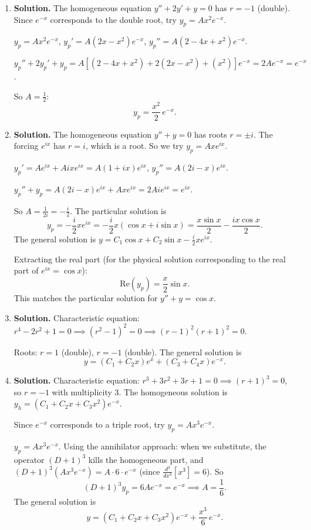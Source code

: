 \begin{enumerate}
Roots: $r=1$ (double), $r=2$. The general solution is
\[
\boxed{y = (C_1+C_2 x)e^x + C_3 e^{2x}}.
\]

\item \textbf{Solution.}
The homogeneous equation $y''+2y'+y=0$ has $r=-1$ (double). Since $e^{-x}$ corresponds to the double root, try $y_p=Ax^2 e^{-x}$.

$y_p=Ax^2 e^{-x}$, $y_p'=A(2x-x^2)e^{-x}$, $y_p''=A(2-4x+x^2)e^{-x}$.

$y_p''+2y_p'+y_p = A[(2-4x+x^2)+2(2x-x^2)+(x^2)]e^{-x}=2Ae^{-x}=e^{-x}$.

So $A=\frac{1}{2}$:
\[
\boxed{y_p = \frac{x^2}{2}\,e^{-x}}.
\]

\item \textbf{Solution.}
The homogeneous equation $y''+y=0$ has roots $r=\pm i$. The forcing $e^{ix}$ has $r=i$, which is a root. So we try $y_p=Axe^{ix}$.

$y_p'=Ae^{ix}+Aixe^{ix}=A(1+ix)e^{ix}$, $y_p''=A(2i-x)e^{ix}$.

$y_p''+y_p = A(2i-x)e^{ix}+Axe^{ix}=2Aie^{ix}=e^{ix}$.

So $A=\frac{1}{2i}=-\frac{i}{2}$. The particular solution is
\[
y_p = -\frac{i}{2}xe^{ix} = -\frac{i}{2}x(\cos x+i\sin x) = \frac{x\sin x}{2}-\frac{ix\cos x}{2}.
\]
The general solution is $y = C_1\cos x + C_2\sin x - \frac{i}{2}xe^{ix}$.

Extracting the real part (for the physical solution corresponding to the real part of $e^{ix}=\cos x$):
\[
\boxed{\text{Re}(y_p) = \frac{x}{2}\sin x}.
\]
This matches the particular solution for $y''+y=\cos x$.

\item \textbf{Solution.}
Characteristic equation: $r^4-2r^2+1=0 \implies (r^2-1)^2=0 \implies (r-1)^2(r+1)^2=0$.

Roots: $r=1$ (double), $r=-1$ (double). The general solution is
\[
\boxed{y = (C_1+C_2 x)e^x+(C_3+C_4 x)e^{-x}}.
\]

\item \textbf{Solution.}
Characteristic equation: $r^3+3r^2+3r+1=0 \implies (r+1)^3=0$, so $r=-1$ with multiplicity 3. The homogeneous solution is $y_h=(C_1+C_2 x+C_3 x^2)e^{-x}$.

Since $e^{-x}$ corresponds to a triple root, try $y_p=Ax^3 e^{-x}$.

$y_p=Ax^3 e^{-x}$. Using the annihilator approach: when we substitute, the operator $(D+1)^3$ kills the homogeneous part, and $(D+1)^3(Ax^3 e^{-x})=A\cdot 6\cdot e^{-x}$ (since $\frac{d^3}{dx^3}[x^3]=6$). So
\[
(D+1)^3 y_p = 6Ae^{-x}=e^{-x} \implies A=\frac{1}{6}.
\]
The general solution is
\[
\boxed{y = (C_1+C_2 x+C_3 x^2)e^{-x}+\frac{x^3}{6}\,e^{-x}}.
\]


\end{enumerate}
